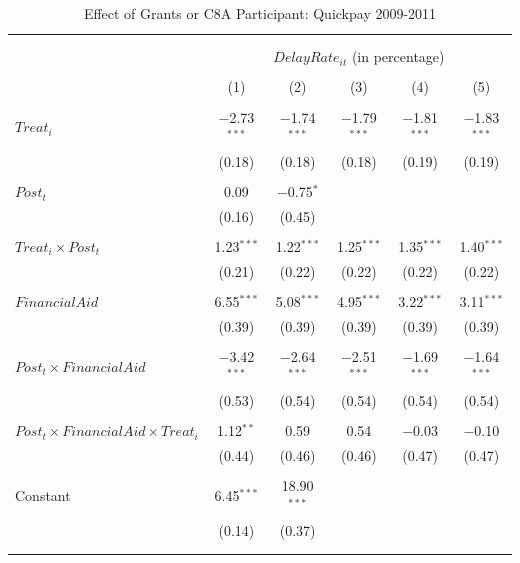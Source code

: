 \documentclass[
]{article}
\begin{document}
\begin{table}[H] \centering 
  \caption{Effect of Grants or C8A Participant: Quickpay 2009-2011} 
  \label{} 
\small 
\begin{tabular}{@{\extracolsep{-2pt}}lccccc} 
\\[-1.8ex]\hline 
\hline \\[-1.8ex] 
\\[-1.8ex] & \multicolumn{5}{c}{$DelayRate_{it}$ (in percentage)} \\ 
\\[-1.8ex] & (1) & (2) & (3) & (4) & (5)\\ 
\hline \\[-1.8ex] 
 $Treat_i$ & $-$2.73$^{***}$ & $-$1.74$^{***}$ & $-$1.79$^{***}$ & $-$1.81$^{***}$ & $-$1.83$^{***}$ \\ 
  & (0.18) & (0.18) & (0.18) & (0.19) & (0.19) \\ 
  & & & & & \\ 
 $Post_t$ & 0.09 & $-$0.75$^{*}$ &  &  &  \\ 
  & (0.16) & (0.45) &  &  &  \\ 
  & & & & & \\ 
 $Treat_i \times Post_t$ & 1.23$^{***}$ & 1.22$^{***}$ & 1.25$^{***}$ & 1.35$^{***}$ & 1.40$^{***}$ \\ 
  & (0.21) & (0.22) & (0.22) & (0.22) & (0.22) \\ 
  & & & & & \\ 
 $FinancialAid$ & 6.55$^{***}$ & 5.08$^{***}$ & 4.95$^{***}$ & 3.22$^{***}$ & 3.11$^{***}$ \\ 
  & (0.39) & (0.39) & (0.39) & (0.39) & (0.39) \\ 
  & & & & & \\ 
 $Post_t \times FinancialAid$ & $-$3.42$^{***}$ & $-$2.64$^{***}$ & $-$2.51$^{***}$ & $-$1.69$^{***}$ & $-$1.64$^{***}$ \\ 
  & (0.53) & (0.54) & (0.54) & (0.54) & (0.54) \\ 
  & & & & & \\ 
 $Post_t \times FinancialAid \times Treat_i$ & 1.12$^{**}$ & 0.59 & 0.54 & $-$0.03 & $-$0.10 \\ 
  & (0.44) & (0.46) & (0.46) & (0.47) & (0.47) \\ 
  & & & & & \\ 
 Constant & 6.45$^{***}$ & 18.90$^{***}$ &  &  &  \\ 
  & (0.14) & (0.37) &  &  &  \\ 
  & & & & & \\ 
\hline \\[-1.8ex] 

\end{tabular}
\end{table}
\end{document}
